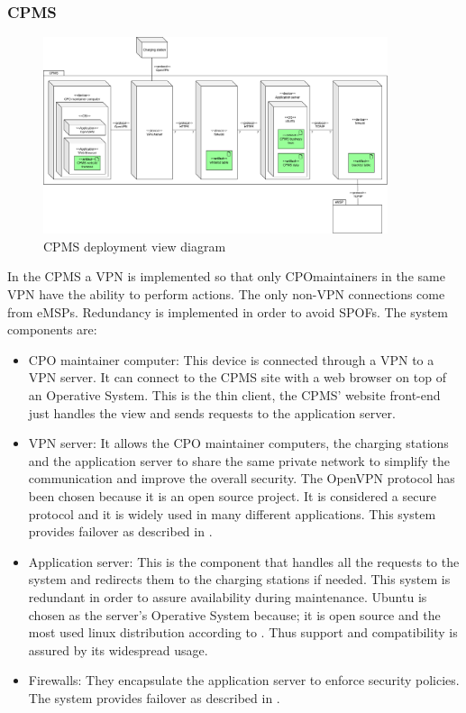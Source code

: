 \subsubsection{\ac{CPMS}}
\begin{figure}[!h]
    \begin{center}
        \includegraphics[keepaspectratio, width=0.9\textwidth]{Graphics/DD-CPMS-deployment.drawio.png}
        \caption{CPMS deployment view diagram}
        \label{fig:CPMS-deployment}
    \end{center}
\end{figure}

In the \ac{CPMS} a \ac{VPN} is implemented so that only \ac{CPO}maintainers in the same \ac{VPN} have the ability to perform actions. The only non-\ac{VPN} connections come from \acp{eMSP}.
Redundancy is implemented in order to avoid \acp{SPOF}.
The system components are:
\begin{itemize}
    \item \ac{CPO} maintainer computer: This device is connected through a \ac{VPN} to a \ac{VPN} server. It can connect to the \ac{CPMS} site with a web browser on top of an Operative System.
          This is the thin client, the \ac{CPMS}' website front-end just handles the view and sends requests to the application server.
    \item \ac{VPN} server: It allows the \ac{CPO} maintainer computers, the charging stations and the application server to share the same private network to simplify the communication and improve the overall security.
          The OpenVPN protocol \cite{ref:openvpn-site} has been chosen because it is an open source project. It is considered a secure protocol and it is widely used in many different applications.
          This system provides failover as described in \cite{ref:redundant-VPN-servers}.
    \item Application server: This is the component that handles all the requests to the system and redirects them to the charging stations if needed. This system is redundant in order to assure availability during maintenance.
          Ubuntu is chosen as the server's Operative System because; it is open source and the most used linux distribution according to \cite{ref:most-popular-linux-distro}. Thus support and compatibility is assured by its widespread usage.
    \item Firewalls: They encapsulate the application server to enforce security policies. The system provides failover as described in \cite{ref:redundant-firewalls}.
\end{itemize}
\clearpage

